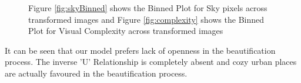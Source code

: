 \begin{figure}[!t]
	\centering
	\hspace*{-5mm}
\vspace{-0.4cm}
\caption{ Figure \ref{fig:skyBinned} shows the Binned Plot for Sky pixels across transformed images and Figure \ref{fig:complexity} shows the Binned Plot for Visual Complexity across transformed images }
\vspace{-0.4cm}
\end{figure}


It can be seen that our model prefers lack of openness in the beautification process. The inverse 'U' Relationship is completely absent and cozy urban places are actually favoured in the beautification process. 


